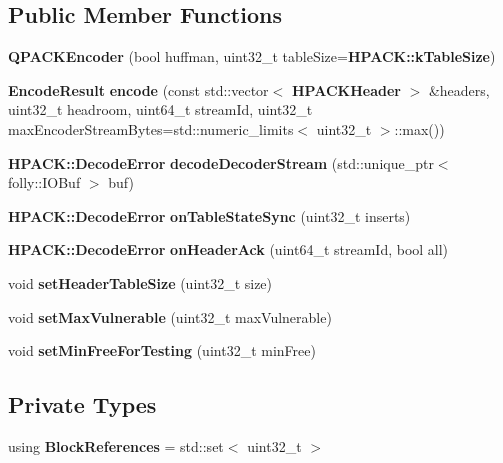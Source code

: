 \subsection*{Public Member Functions}
\begin{DoxyCompactItemize}
\item 
{\bf Q\+P\+A\+C\+K\+Encoder} (bool huffman, uint32\+\_\+t table\+Size={\bf H\+P\+A\+C\+K\+::k\+Table\+Size})
\item 
{\bf Encode\+Result} {\bf encode} (const std\+::vector$<$ {\bf H\+P\+A\+C\+K\+Header} $>$ \&headers, uint32\+\_\+t headroom, uint64\+\_\+t stream\+Id, uint32\+\_\+t max\+Encoder\+Stream\+Bytes=std\+::numeric\+\_\+limits$<$ uint32\+\_\+t $>$\+::max())
\item 
{\bf H\+P\+A\+C\+K\+::\+Decode\+Error} {\bf decode\+Decoder\+Stream} (std\+::unique\+\_\+ptr$<$ folly\+::\+I\+O\+Buf $>$ buf)
\item 
{\bf H\+P\+A\+C\+K\+::\+Decode\+Error} {\bf on\+Table\+State\+Sync} (uint32\+\_\+t inserts)
\item 
{\bf H\+P\+A\+C\+K\+::\+Decode\+Error} {\bf on\+Header\+Ack} (uint64\+\_\+t stream\+Id, bool all)
\item 
void {\bf set\+Header\+Table\+Size} (uint32\+\_\+t size)
\item 
void {\bf set\+Max\+Vulnerable} (uint32\+\_\+t max\+Vulnerable)
\item 
void {\bf set\+Min\+Free\+For\+Testing} (uint32\+\_\+t min\+Free)
\end{DoxyCompactItemize}
\subsection*{Private Types}
\begin{DoxyCompactItemize}
\item 
using {\bf Block\+References} = std\+::set$<$ uint32\+\_\+t $>$
\end{DoxyCompactItemize}
